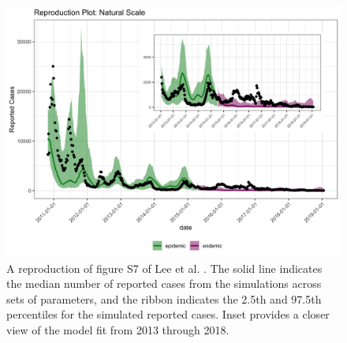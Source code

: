 \documentclass[12pt]{article}
\begin{document}
\begin{figure}[H]
  \centering
  \includegraphics[width=150mm]{reprod_inset.png}
  \caption{A reproduction of figure S7 of Lee et al. \cite{Lee_supp}. The solid line indicates the median number of reported cases from the simulations across sets of parameters, and the ribbon indicates the 2.5th and 97.5th percentiles for the simulated reported cases. Inset provides a closer view of the model fit from 2013 through 2018.}
  \label{fig:A1}
\end{figure}
\end{document}
